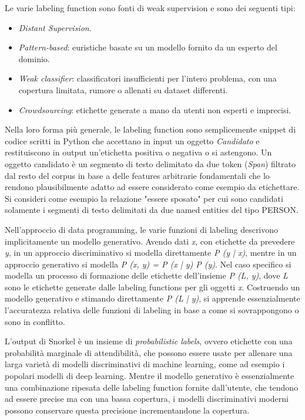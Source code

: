 Le varie labeling function sono fonti di weak supervision e sono dei seguenti tipi:
\begin{itemize}
\item \textit{Distant Supervision}.
\item \textit{Pattern-based}: euristiche basate su un modello fornito da un esperto del dominio. 
\item \textit{Weak classifier}: classificatori insufficienti per l'intero problema, con una copertura limitata, rumore o allenati su dataset differenti.
\item \textit{Crowdsourcing}: etichette generate a mano da utenti non esperti e imprecisi.
\end{itemize}

Nella loro forma più generale, le labeling function sono semplicemente snippet di codice scritti in Python che accettano in input un oggetto \textit{Candidato} e restituiscono in output un'etichetta positiva o negativa o si astengono. Un oggetto candidato è un segmento di testo delimitato da due token (\textit{Span}) filtrato dal resto del corpus in base a delle features arbitrarie fondamentali che lo rendono plausibilmente adatto ad essere considerato come esempio da etichettare. Si consideri come esempio la relazione "essere sposato" per cui sono candidati solamente i segmenti di testo delimitati da due named entities del tipo PERSON. 

Nell'approccio di data programming, le varie funzioni di labeling descrivono implicitamente un modello generativo. Avendo dati \textit{x}, con etichette da prevedere \textit{y}, in un approccio discriminativo si modella direttamente \textit{P (y | x)}, mentre in un approccio generativo si modella \textit{P (x, y) = P (x | y) P (y)}. Nel caso specifico si modella un processo di formazione delle etichette dell'insieme \textit{P (L, y)}, dove \textit{L} sono le etichette generate dalle labeling functions per gli oggetti \textit{x}. Costruendo un modello generativo e stimando direttamente \textit{P (L | y)}, si apprende essenzialmente l'accuratezza relativa delle funzioni di labeling in base a come si sovrappongono o sono in conflitto. 

L'output di Snorkel è un insieme di \textit{probabilistic labels}, ovvero etichette con una probabilità marginale di attendibilità, che possono essere usate per allenare una larga varietà di modelli discriminativi di machine learning, come ad esempio i popolari modelli di deep learning.
Mentre il modello generativo è essenzialmente una combinazione ripesata delle labeling function fornite dall'utente, che tendono ad essere precise ma con una bassa copertura, i modelli discriminativi moderni possono conservare questa precisione incrementandone la copertura. 

